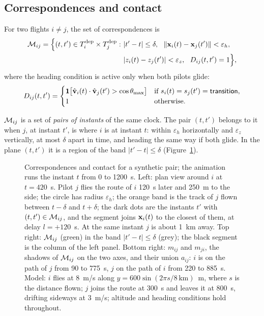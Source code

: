 \subsection{Correspondences and contact}\label{sec:correspondences}

\begin{definition}[correspondence]\label{def:correspondence}
For two flights $i\ne j$, the set of correspondences is
\begin{equation}\label{eq:correspondences}
  \begin{split}
  \mathcal{M}_{ij} = \Bigl\{(t,t')\in T^{\mathrm{dep}}_i\times T^{\mathrm{dep}}_j:\ & |t'-t|\le\delta,\ \ \|\mathbf{x}_i(t)-\mathbf{x}_j(t')\|<\varepsilon_h,\\
  & |z_i(t)-z_j(t')|<\varepsilon_z,\ \ D_{ij}(t,t')=1\Bigr\},
  \end{split}
\end{equation}
where the heading condition is active only when both pilots glide:
\begin{equation}\label{eq:heading}
  D_{ij}(t,t') = \begin{cases}
    \mathbf{1}\bigl[\hat{\mathbf{v}}_i(t)\cdot\hat{\mathbf{v}}_j(t') > \cos\theta_{\max}\bigr] & \text{if } s_i(t)=s_j(t')=\textsf{transition},\\
    1 & \text{otherwise.}
  \end{cases}
\end{equation}
\end{definition}

\begin{inwords}
$\mathcal{M}_{ij}$ is a set of \emph{pairs of instants} of the same clock. The pair $(t,t')$ belongs to it
when $j$, at instant $t'$, is where $i$ is at instant $t$: within $\varepsilon_h$ horizontally and
$\varepsilon_z$ vertically, at most $\delta$ apart in time, and heading the same way if both glide.
In the plane $(t,t')$ it is a region of the band $|t'-t|\le\delta$ (Figure~\ref{fig:contact}).
\end{inwords}

\begin{figure}
\centering
{}
\caption{\animmark Correspondences and contact for a synthetic pair; the animation runs the
instant $t$ from 0 to 1200~s. Left: plan view around $i$ at $t=420$~s. Pilot $j$ flies the route of
$i$ 120~s later and 250~m to the side; the circle has radius $\varepsilon_h$; the orange band is
the track of $j$ flown between $t-\delta$ and $t+\delta$; the dark dots are the instants $t'$ with
$(t,t')\in\mathcal{M}_{ij}$, and the segment joins $\mathbf{x}_i(t)$ to the closest of them, at delay $l=+120$~s.
At the same instant $j$ is about 1~km away. Top right: $\mathcal{M}_{ij}$ (green) in the band
$|t'-t|\le\delta$ (grey); the black segment is the column of the left panel. Bottom right:
$m_{ij}$ and $m_{ji}$, the shadows of $\mathcal{M}_{ij}$ on the two axes, and their union $a_{ij}$: $i$ is
on the path of $j$ from 90 to 775~s, $j$ on the path of $i$ from 220 to 885~s. Model: $i$ flies at
8~m/s along $y=600\sin(2\pi s/8\,\mathrm{km})$~m, where $s$ is the distance flown; $j$ joins the
route at 300~s and leaves it at 800~s, drifting sideways at 3~m/s; altitude and heading
conditions hold throughout.}
\label{fig:contact}
\end{figure}


